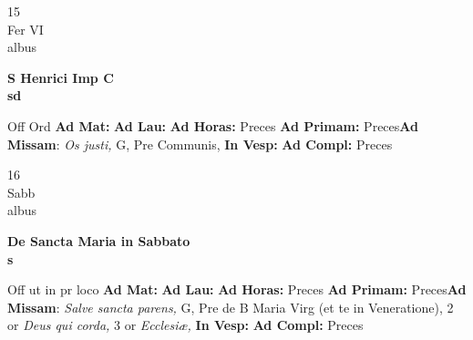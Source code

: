 \documentclass[10pt, openany]{book}
\begin{document}
    \begin{center}
        \begin{minipage}{3.5in}
            \vspace{2em}
            \begin{minipage}{0.5in}
                {\Huge 15} \\
                {\normalsize Fer VI} \\
                {\normalsize albus}
            \end{minipage}
            \begin{minipage}{3.0in}
                \textbf{ \large S Henrici Imp C \\
                \textnormal{\normalsize sd}} \\ 
            \end{minipage}
            \begin{justify}Off Ord
                \textbf{Ad Mat: }
                \textbf{Ad Lau: }
                \textbf{Ad Horas: }Preces
                \textbf{Ad Primam: }Preces\textbf{Ad Missam}: \textit{Os justi,} G, Pre Communis,  
                \textbf{In Vesp: }
                \textbf{Ad Compl: }Preces
            \end{justify}
        \end{minipage}
    \end{center}

    \begin{center}
        \begin{minipage}{3.5in}
            \vspace{2em}
            \begin{minipage}{0.5in}
                {\Huge 16} \\
                {\normalsize Sabb} \\
                {\normalsize albus}
            \end{minipage}
            \begin{minipage}{3.0in}
                \textbf{ \large De Sancta Maria in Sabbato \\
                \textnormal{\normalsize s}} \\ 
            \end{minipage}
            \begin{justify}Off ut in pr loco
                \textbf{Ad Mat: }
                \textbf{Ad Lau: }
                \textbf{Ad Horas: }Preces
                \textbf{Ad Primam: }Preces\textbf{Ad Missam}: \textit{Salve sancta parens,} G, Pre de B Maria Virg (et te in Veneratione), 2 or \textit{Deus qui corda,} 3 or \textit{Ecclesiæ,}  
                \textbf{In Vesp: }
                \textbf{Ad Compl: }Preces
            \end{justify}
        \end{minipage}
    \end{center}
\end{document}
